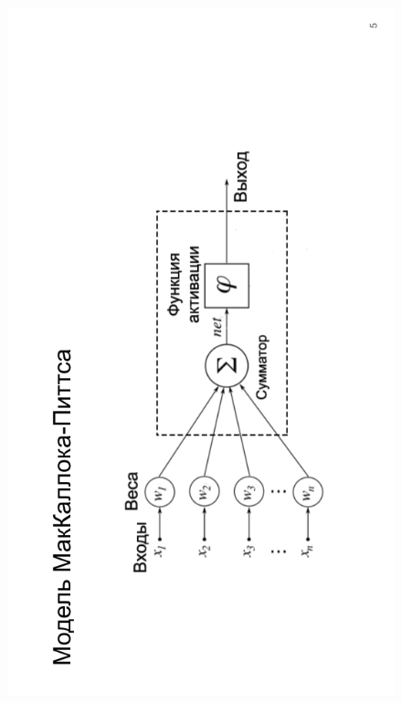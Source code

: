 \begin{figure}[H]
	\begin{center}
		\includegraphics[scale=0.7]{inc/img/slide5.png}
	\end{center}
\end{figure}
